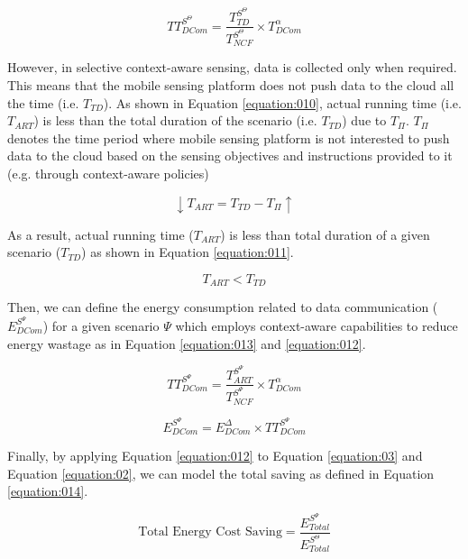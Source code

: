 \documentclass[journal]{IEEEtran}
\begin{document}
\begin{equation}
\label{equation:07}
TT_{DCom}^{S^{\Theta}}  = \frac{T_{TD}^{S^{\Theta}} }{T_{NCF}^{S^{\Theta}}  } \times T_{DCom}^{\alpha }
\end{equation}


However, in selective context-aware sensing, data is collected only when required. This means that the mobile sensing platform does not push data to the cloud all the time (i.e. $T_{TD} $). As shown in Equation \ref{equation:010}, actual running time (i.e. $T_{ART}$) is less than the total duration of the scenario (i.e. $T_{TD} $) due to $T_{\textbf{$\Pi$}}$. $T_{\textbf{$\Pi$}}$ denotes the time period where mobile sensing platform is not interested to push data to the cloud based on the sensing objectives and instructions provided to it (e.g. through context-aware policies) 


\begin{equation}
\label{equation:010}
\downarrow T_{ART}= T_{TD} - T_{\Pi} \uparrow
\end{equation}

As a result, actual running time ($T_{ART}$) is less than total duration of a given scenario ($T_{TD}$) as shown in Equation \ref{equation:011}.

\begin{equation}
\label{equation:011}
T_{ART} < T_{TD}
\end{equation}


Then, we can define the energy consumption related to data communication ($E_{DCom}^{S^{\Psi}}$)  for a given scenario $\Psi$ which employs context-aware capabilities to reduce energy wastage as in Equation \ref{equation:013} and \ref{equation:012}.


\begin{equation}
\label{equation:013}
TT_{DCom}^{S^{\Psi}}  = \frac{T_{ART}^{S^{\Psi}} }{T_{NCF}^{S^{\Psi}}  } \times T_{DCom}^{\alpha }
\end{equation}


\begin{equation}
\label{equation:012}
E_{DCom}^{S^{\Psi}} =  E_{DCom}^{\Delta} \times TT_{DCom}^{S^{\Psi}}
\end{equation}


Finally, by applying Equation \ref{equation:012} to Equation \ref{equation:03} and Equation \ref{equation:02}, we can model the total saving as defined in Equation \ref{equation:014}.

\begin{equation}
\label{equation:014}
\textrm{Total Energy Cost Saving}  = \frac{E_{Total}^{S^{\Psi}}}{E_{Total}^{S^{\Theta}} } 
\end{equation}
\end{document}
